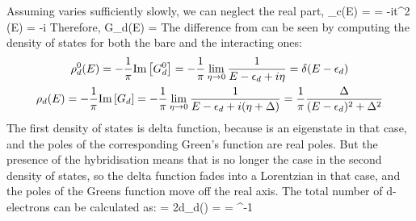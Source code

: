 \documentclass[12pt,twoside]{article}
\numberwithin{equation}{section}
\begin{document}
Assuming  varies sufficiently slowly, we can neglect the real part,
\beq
\Sigma_c(E) =  = -i\pi t^2 \rho(E) = -i\Delta
\eeq
Therefore,
\beq
G_d(E) = 
\eeq
The difference from  can be seen by computing the density of states for both the bare and the interacting ones:
\begin{gather}
    \rho_d^0(E) = -\frac{1}{\pi}\text{Im}\left[{G^0_d}\right] = -\frac{1}{\pi} \lim_{\eta \rightarrow 0} \frac{1}{E - \epsilon_d + i\eta} = \delta(E - \epsilon_d)\\
    \rho_d(E) = -\frac{1}{\pi}\text{Im}\left[{G_d}\right]= -\frac{1}{\pi} \lim_{\eta \rightarrow 0} \frac{1}{E - \epsilon_d + i(\eta+\Delta)} = \frac{1}{\pi}\frac{\Delta}{(E-\epsilon_d)^2 + \Delta^2}\label{densitys}
\end{gather}
The first density of states is delta function, because  is an eigenstate in that case, and the poles of the corresponding Green's function are real poles.
But the presence of the hybridisation means that is no longer the case in the second density of states, so the delta function fades into a Lorentzian in that case, and the poles of the Greens function move off the real axis.
\pb The total number of d-electrons can be calculated as:
\beq[total]
 = 2\int d\epsilon \rho_d(\epsilon) = \fr{2\Delta}{\pi} \int {} = \cot^{-1}
\eeq
\end{document}
